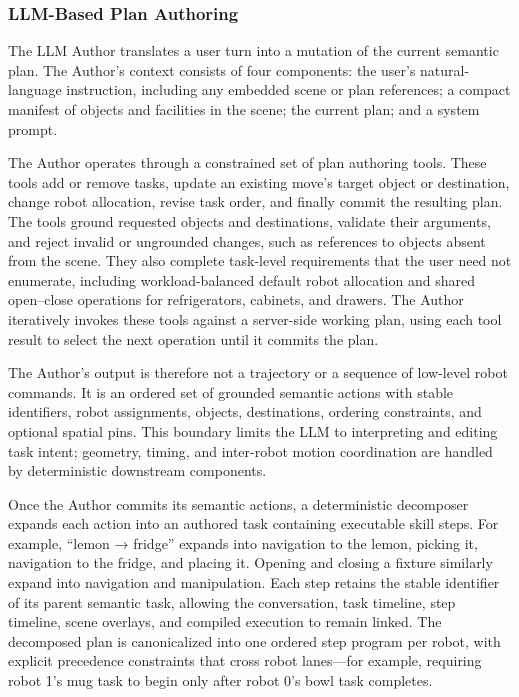 \subsubsection{LLM-Based Plan Authoring}

The LLM Author translates a user turn into a mutation of the current semantic plan.
The Author's context consists of four components: the user's natural-language instruction, including any embedded scene or plan references; a compact manifest of objects and facilities in the scene; the current plan; and a system prompt.

The Author operates through a constrained set of plan authoring tools.
These tools add or remove tasks, update an existing move's target object or destination, change robot allocation, revise task order, and finally commit the resulting plan.
The tools ground requested objects and destinations, validate their arguments, and reject invalid or ungrounded changes, such as references to objects absent from the scene.
They also complete task-level requirements that the user need not enumerate, including workload-balanced default robot allocation and shared open--close operations for refrigerators, cabinets, and drawers.
The Author iteratively invokes these tools against a server-side working plan, using each tool result to select the next operation until it commits the plan.

The Author's output is therefore not a trajectory or a sequence of low-level robot commands.
It is an ordered set of grounded semantic actions with stable identifiers, robot assignments, objects, destinations, ordering constraints, and optional spatial pins.
This boundary limits the LLM to interpreting and editing task intent; geometry, timing, and inter-robot motion coordination are handled by deterministic downstream components.

Once the Author commits its semantic actions, a deterministic decomposer expands each action into an authored task containing executable skill steps.
For example, ``lemon → fridge'' expands into navigation to the lemon, picking it, navigation to the fridge, and placing it.
Opening and closing a fixture similarly expand into navigation and manipulation.
Each step retains the stable identifier of its parent semantic task, allowing the conversation, task timeline, step timeline, scene overlays, and compiled execution to remain linked.
The decomposed plan is canonicalized into one ordered step program per robot, with explicit precedence constraints that cross robot lanes—for example, requiring robot 1's mug task to begin only after robot 0's bowl task completes.

